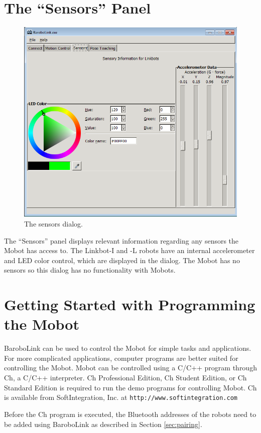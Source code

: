 \documentclass{article}
\begin{document}
\section{The ``Sensors'' Panel}
\begin{figure}[H]
\begin{center}
\includegraphics[width=4.5in]{images/sensors.png}
\end{center}
\caption{\label{fig:sensors.png} The sensors dialog.}
\end{figure}

The ``Sensors'' panel displays relevant information regarding any sensors the
Mobot has access to. The Linkbot-I and -L robots have an internal accelerometer and
LED color control, which are displayed in the dialog. The Mobot has no sensors
so this dialog has no functionality with Mobots. 

\section{Getting Started with Programming the Mobot}
BaroboLink can be used to control the Mobot for simple tasks and applications.
For more complicated applications, computer programs are better suited for controlling
the Mobot.
Mobot can be controlled using a C/C++ program through Ch, a C/C++ interpreter.
Ch Professional Edition, Ch Student Edition, or Ch Standard Edition is required to run the
demo programs for controlling Mobot. Ch is available from SoftIntegration, Inc. at
\texttt{http://www.softintegration.com}

Before the Ch program is executed, the Bluetooth addresses of the robots
need to be added using BaroboLink as described in Section \ref{sec:pairing}.
\end{document}
